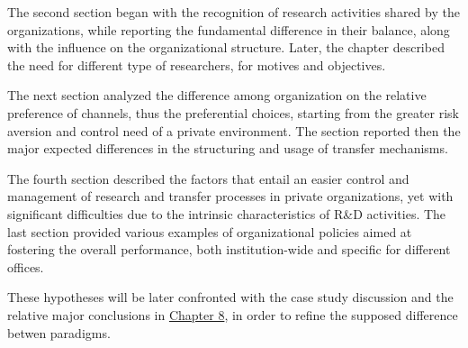The second section began with the recognition of research activities shared by the organizations, while reporting the fundamental difference in their balance, along with the influence on the organizational structure. Later, the chapter described the need for different type of researchers, for motives and objectives.

The next section analyzed the difference among organization on the relative preference of channels, thus the preferential choices, starting from the greater risk aversion and control need of a private environment. The section reported then the major expected differences in the structuring and usage of transfer mechanisms.

The fourth section described the factors that entail an easier control and management of research and transfer processes in private organizations, yet with significant difficulties due to the intrinsic characteristics of R\&D activities. The last section provided various examples of organizational policies aimed at fostering the overall performance, both institution-wide and specific for different offices. 

These hypotheses will be later confronted with the case study discussion and the relative major conclusions in \hyperref[Chapter8]{Chapter 8}, in order to refine the supposed difference betwen paradigms. 